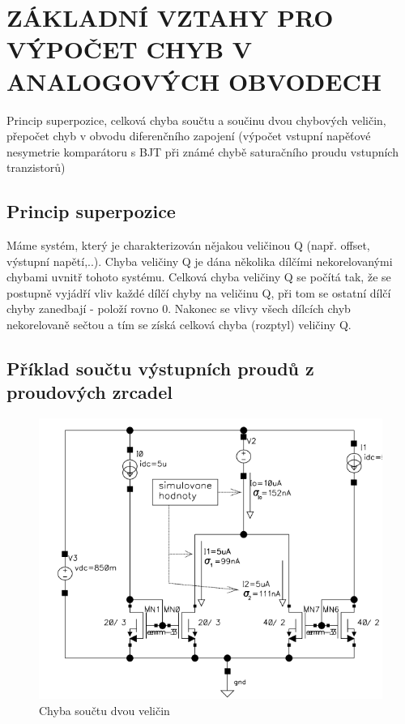 \section{ZÁKLADNÍ VZTAHY PRO VÝPOČET CHYB V ANALOGOVÝCH OBVODECH }
Princip superpozice, celková chyba součtu a součinu dvou chybových veličin, přepočet chyb v obvodu diferenčního zapojení (výpočet vstupní napěťové nesymetrie komparátoru s BJT při známé chybě saturačního proudu vstupních tranzistorů)

\subsection{Princip superpozice}
Máme systém, který je charakterizován nějakou veličinou Q (např. offset, výstupní napětí,..). Chyba veličiny Q je dána několika dílčími nekorelovanými chybami uvnitř tohoto systému. Celková chyba veličiny Q se počítá tak, že se postupně vyjádří vliv každé dílčí chyby na veličinu Q, při tom se ostatní dílčí chyby zanedbají - položí rovno 0. Nakonec se vlivy všech dílcích chyb nekorelovaně sečtou a tím se získá celková chyba (rozptyl) veličiny Q.

\subsection{Příklad součtu výstupních proudů z proudových zrcadel}

\begin{figure}[h]
   \begin{center}
     \includegraphics[scale=0.5]{images/Chyba_Souctu.png}
   \end{center}
   \caption{Chyba součtu dvou veličin}
\end{figure}

